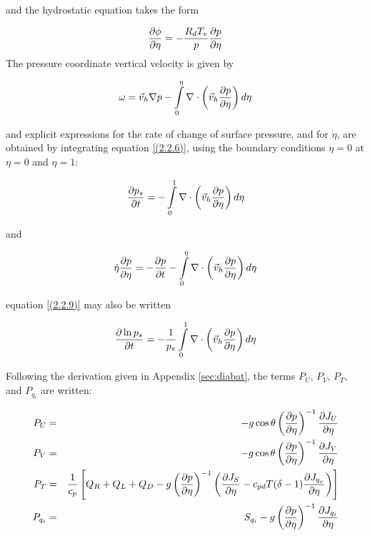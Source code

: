 and the hydrostatic equation takes the form

\begin{equation}
\frac {\partial \phi} {\partial \eta} = -\frac{R_dT_v}{p}\frac {\partial p} {\partial \eta}
\label{(2.2.7)} 
\end{equation}
The pressure coordinate vertical velocity is given by

\begin{equation}
\omega = \vec{v}_h\nabla p
-\int\limits_0^{\eta}\nabla\cdot\left(\vec{v}_h\frac {\partial p} {\partial \eta}\right) d\eta
\label{(2.2.8)} 
\end{equation}

and explicit expressions for the rate of change of surface pressure,
and for $\dot{\eta}$, are obtained by integrating equation
\ref{(2.2.6)}, using the boundary conditions $\dot{\eta} = 0$ at $\eta
= 0$ and $\eta = 1$:

\begin{equation}
\frac {\partial p_s} {\partial t} = -\int\limits_0^1 \nabla\cdot\left(\vec{v}_h\frac {\partial p} {\partial \eta}\right) d\eta
\label{(2.2.9)} 
\end{equation}

and

\begin{equation}
\dot{\eta}\frac {\partial p} {\partial \eta} = -\frac {\partial p} {\partial t}-\int\limits_0^{\eta}
\nabla\cdot\left(\vec{v}_h\frac {\partial p} {\partial \eta}\right) d\eta
\label{(2.2.10)}
\end{equation} 

equation \ref{(2.2.9)} may also be written

\begin{equation}
\frac {\partial \ln{p_s}} {\partial t} = -\frac{1}{p_s}\int\limits_0^1 
\nabla\cdot\left(\vec{v}_h\frac {\partial p} {\partial \eta}\right) d\eta
\label{(2.2.11)}
\end{equation}

Following the derivation given in Appendix \ref{sec:diabat}, the terms
$P_U$, $P_V$, $P_T$, and $P_{q_i}$ are written:

\begin{eqnarray}
P_U & = &  -g\cos{\theta}\left(\frac {\partial p} {\partial \eta}\right)^{-1}\frac {\partial J_U} {\partial \eta}
\label{(2.2.12)} \\
P_V & = &  -g\cos{\theta}\left(\frac {\partial p} {\partial \eta}\right)^{-1}\frac {\partial J_V} {\partial \eta}
\label{(2.2.13)} \\  
P_T & = &  \frac{1}{c_p}\left[Q_R+Q_L+Q_D-g\left(\frac {\partial p} {\partial \eta}\right)^{-1}
\left(\frac {\partial J_S} {\partial \eta}-c_{pd}T(\delta-1)\frac {\partial J_{q_v}} {\partial \eta}\right)\right]
\label{(2.2.14)} \\
P_{q_i} & = & S_{q_i} -g\left(\frac {\partial p} {\partial \eta}\right)^{-1}\frac {\partial J_{q_i}} {\partial \eta}
\label{(2.2.15)} 
\end{eqnarray}

